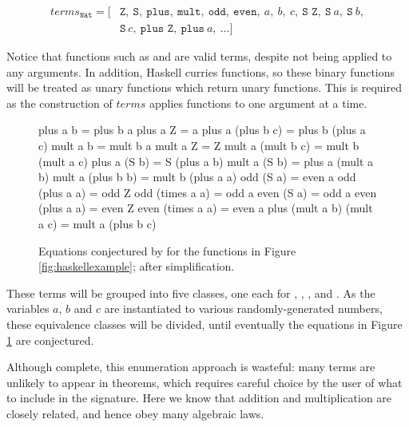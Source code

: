 \begin{align*}
  terms_{\texttt{Nat}} = [& \texttt{Z},\ \texttt{S},\ \texttt{plus},\ \texttt{mult},\ \texttt{odd},\ \texttt{even},\ a,\ b,\ c,\ \texttt{S Z},\ \texttt{S}\ a,\ \texttt{S}\ b, \\
                     & \texttt{S}\ c,\ \texttt{plus Z},\ \texttt{plus}\ a,\ \dots ]
\end{align*}

Notice that functions such as  and  are valid terms, despite
not being applied to any arguments. In addition, Haskell curries functions, so
these binary functions will be treated as unary functions which return unary
functions. This is required as the construction of $terms$ applies functions to
one argument at a time.

\begin{figure}
  \begin{haskell}
                  plus a b = plus b a
                  plus a Z = a
         plus a (plus b c) = plus b (plus a c)
                  mult a b = mult b a
                  mult a Z = Z
         mult a (mult b c) = mult b (mult a c)
              plus a (S b) = S (plus a b)
              mult a (S b) = plus a (mult a b)
         mult a (plus b b) = mult b (plus a a)
                 odd (S a) = even a
            odd (plus a a) = odd Z
           odd (times a a) = odd a
                even (S a) = odd a
           even (plus a a) = even Z
          even (times a a) = even a
plus (mult a b) (mult a c) = mult a (plus b c)
  \end{haskell}
  \caption{Equations conjectured by \qspec{} for the functions in Figure
    \ref{fig:haskellexample}; after simplification.}
  \label{fig:qspecresult}
\end{figure}

These terms will be grouped into five classes, one each for ,
, ,  and . As the
variables $a$, $b$ and $c$ are instantiated to various randomly-generated
numbers, these equivalence classes will be divided, until eventually the
equations in Figure \ref{fig:qspecresult} are conjectured.

Although complete, this enumeration approach is wasteful: many terms are
unlikely to appear in theorems, which requires careful choice by the user of
what to include in the signature. Here we know that addition and multiplication
are closely related, and hence obey many algebraic laws.

